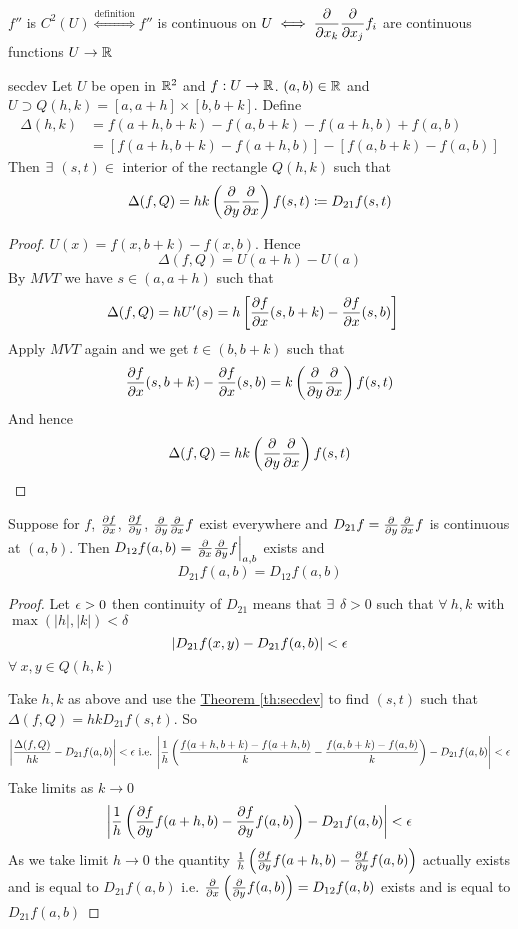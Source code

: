 $f''$ is $C^2(U) \overset{\text{definition}}{\iff} f''$ is continuous on $U\iff \dfrac{\partial }{\partial x_k}\dfrac{\partial }{\partial x_j}f_i$ are continuous  functions $U\to \mathbb{R}$
\begin{Theorem}{}{secdev}
	Let $U$ be open in $\mathbb{R}^2$ and $f:U\to \mathbb{R}$. $(a,b)\in \mathbb{R}$ and $U\supset Q(h,k)=[a,a+h]\times [b,b+k]$. Define \begin{align*}
		\Delta(h,k) & =f(a+h,b+k)-f(a,b+k)-f(a+h,b)+f(a,b)     \\
		            & =[f(a+h,b+k)-f(a+h,b)]-[f(a,b+k)-f(a,b)]
	\end{align*}Then $\exists$ $(s,t)\in $ interior of the rectangle $Q(h,k)$ such that $$\Delta(f,Q)=hk\left( \frac{\partial }{\partial y}\frac{\partial }{\partial x}\right)f(s,t)\coloneqq D_{21}f(s,t)$$
\end{Theorem}
\begin{proof}
	$U(x)=f(x,b+k)-f(x,b)$. Hence $$\Delta(f,Q)=U(a+h)-U(a)$$By $MVT$ we have  $s\in (a,a+h)$ such that \begin{align*}
		\Delta(f,Q) & =hU'(s)=h\left[ \frac{\partial f}{\partial x}(s,b+k)-\frac{\partial f}{\partial x}(s,b) \right]
	\end{align*}Apply $MVT$ again and we get $t\in (b,b+k)$ such that $$\frac{\partial f}{\partial x}(s,b+k)-\frac{\partial f}{\partial x}(s,b)=k\left(\frac{\partial }{\partial y}\frac{\partial }{\partial x}\right)f(s,t)$$And hence $$\Delta(f,Q)=hk\left(\frac{\partial }{\partial y}\frac{\partial }{\partial x}\right)f(s,t)$$
\end{proof}
\begin{Theorem}{}{}
	Suppose for $f$, $\frac{\partial f}{\partial x}$, $\frac{\partial f}{\partial y}$, $\frac{\partial }{\partial y}\frac{\partial }{\partial x}f$ exist everywhere and  $D_{21}f=\frac{\partial }{\partial y}\frac{\partial }{\partial x}f$ is  continuous  at $(a,b)$. Then $D_{12}f(a,b)=\left.\frac{\partial }{\partial x}\frac{\partial }{\partial y}f\right|_{a,b}$ exists and $$D_{21}f(a,b)=D_{12} f(a,b)$$
\end{Theorem}
\begin{proof}
	Let $\epsilon>0$ then  continuity of $D_{21}$ means that $\exists$ $\delta>0$  such that  $\forall\ h,k$ with $\max(|h|,|k|)<\delta$ $$\left| D_{21}f(x,y)-D_{21}f(a,b)\right|<\epsilon$$ $\forall\ x,y\in Q(h,k)$
	
	Take $h,k$ as above  and use the  \hyperref[th:secdev]{Theorem \ref{th:secdev}} to find $(s,t)$  such that $\Delta (f,Q)=hkD_{21}f(s,t)$. So $$\left| \frac{\Delta(f,Q)}{hk}-D_{21}f(a,b) \right|<\epsilon \text{ i.e. }
\Bigg| \frac{1}{h}\left( \frac{f(a+h,b+k)-f(a+h,b)}{k}-\frac{f(a,b+k)-f(a,b)}{k} \right) -D_{21}f(a,b)\Bigg| <\epsilon$$
Take limits as $k\to 0$ $$\left|\frac1h \left( \frac{\partial f}{\partial y}f(a+h,b)-\frac{\partial f}{\partial y}f(a,b) \right)  -D_{21}f(a,b)\right|<\epsilon$$As we take limit $h\to 0$ the quantity $\frac1h \left( \frac{\partial f}{\partial y}f(a+h,b)-\frac{\partial f}{\partial y}f(a,b) \right)$ actually exists  and is equal to $D_{21}f(a,b)$ i.e. $\frac{\partial }{\partial x}\left(\frac{\partial }{\partial y}f(a,b)\right)=D_{12}f(a,b)$ exists and is equal to $D_{21}f(a,b)$
\end{proof}
